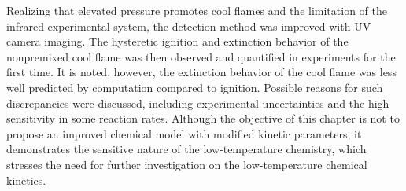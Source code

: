 Realizing that elevated pressure promotes cool flames and the limitation of the infrared experimental system, the detection method was improved with UV camera imaging.  The hysteretic ignition and extinction behavior of the nonpremixed cool flame was then observed and quantified in experiments for the first time.  It is noted, however, the extinction behavior of the cool flame was less well predicted by computation compared to ignition.  Possible reasons for such discrepancies were discussed, including experimental uncertainties and the high sensitivity in some reaction rates.  Although the objective of this chapter is not to propose an improved chemical model with modified kinetic parameters, it demonstrates the sensitive nature of the low-temperature chemistry, which stresses the need for further investigation on the low-temperature chemical kinetics. 
